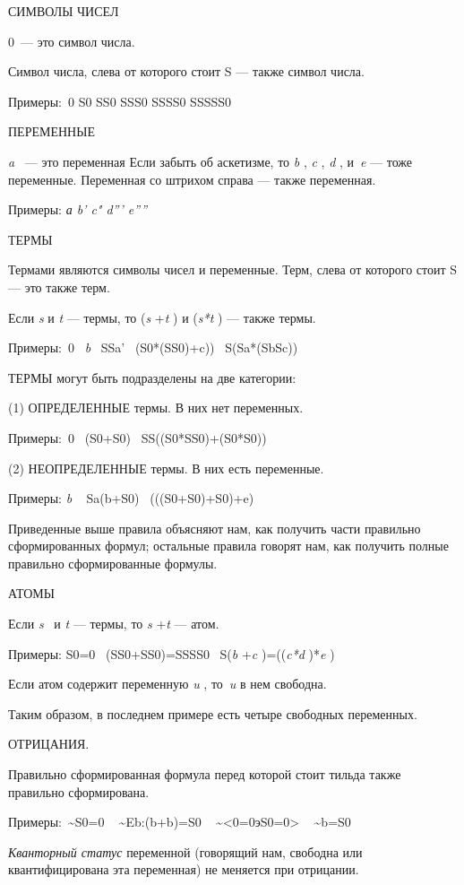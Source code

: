 \documentclass[../main.tex]{subfiles}
\begin{document}
СИМВОЛЫ ЧИСЕЛ

0~--- это символ числа.

Символ числа, слева от которого стоит S --- также символ числа.

Примеры:~0 S0 SS0 SSS0 SSSS0 SSSSS0

ПЕРЕМЕННЫЕ

\emph{a} ~--- это переменная Если забыть об аскетизме, то \emph{b} , \emph{c} , \emph{d} , и~\emph{e} --- тоже переменные. Переменная со штрихом справа --- также переменная.

Примеры: \emph{а b' c" d''' e''''}

ТЕРМЫ

Термами являются символы чисел и переменные. Терм, слева от которого стоит S --- это также терм.

Если \emph{s} и \emph{t} --- термы, то (\emph{s} +\emph{t} ) и (\emph{s*t} ) --- также термы.

Примеры:~0~ \emph{b} ~SSa' ~(S0*(SS0)+c))~ S(Sa*(SbSc))

ТЕРМЫ могут быть подразделены на две категории:

(1) ОПРЕДЕЛЕННЫЕ термы. В них нет переменных.

Примеры:~0 ~(S0+S0) ~SS((S0*SS0)+(S0*S0))

(2) НЕОПРЕДЕЛЕННЫЕ термы. В них есть переменные.

Примеры: \emph{b} ~ Sa(b+S0) ~(((S0+S0)+S0)+e)

Приведенные выше правила объясняют нам, как получить части правильно сформированных формул; остальные правила говорят нам, как получить полные правильно сформированные формулы.

АТОМЫ

Если \emph{s} ~и \emph{t} --- термы, то \emph{s} +\emph{t} --- атом.

Примеры: S0=0~ (SS0+SS0)=SSSS0~ S(\emph{b} +\emph{c} )=((\emph{c*d} )*\emph{e} )

Если атом содержит переменную \emph{u} , то~\emph{u} в нем свободна.

Таким образом, в последнем примере есть четыре свободных переменных.

ОТРИЦАНИЯ.

Правильно сформированная формула перед которой стоит тильда также правильно сформирована.

Примеры:~\textasciitilde S0=0 ~ \textasciitilde Eb:(b+b)=S0 ~ \textasciitilde\textless0=0эS0=0\textgreater{} ~ \textasciitilde b=S0

\emph{Кванторный статус} переменной (говорящий нам, свободна или квантифицирована эта переменная) не меняется при отрицании.
\end{document}

